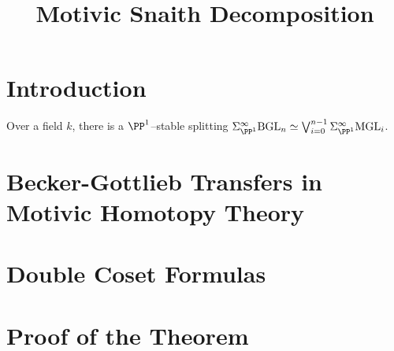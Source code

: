 



\usepackage{subfiles}


\title{Motivic Snaith Decomposition} \date{}
\maketitle

{\footnotesize
  \tableofcontents
}

\section{Introduction}

\begin{theorem}
    Over a field \(k\), there is a \(\PP^1\)--stable splitting \(\Sigma^\infty_{\PP^1}\BGL_n \simeq \bigvee_{i=0}^{n-1} \Sigma^\infty_{\PP^1}\MGL_i\).
\end{theorem}

\section{Becker-Gottlieb Transfers in Motivic Homotopy Theory}

\section{Double Coset Formulas}

\section{Proof of the Theorem}

\printbibliography

\listoftodos

